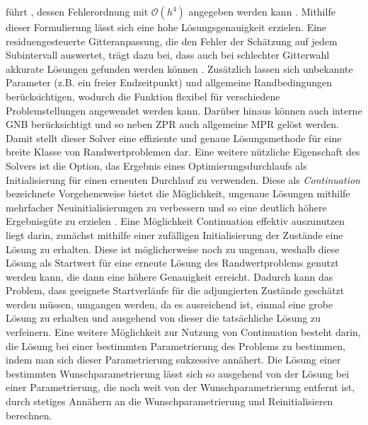 führt \cite{Cash.1980}, dessen Fehlerordnung mit $\mathcal{O}(h^4)$ angegeben werden kann \cite{Kierzenka.2001}. Mithilfe dieser Formulierung lässt sich eine hohe Lösungsgenauigkeit erzielen. Eine residuengesteuerte Gitteranpassung, die den Fehler der Schätzung auf jedem Subintervall auswertet, trägt dazu bei, dass auch bei schlechter Gitterwahl akkurate Lösungen gefunden werden können \cite{Kierzenka.2001}. Zusätzlich lassen sich unbekannte Parameter (z.B. ein freier Endzeitpunkt) und allgemeine Randbedingungen berücksichtigen, wodurch die Funktion flexibel für verschiedene Problemstellungen angewendet werden kann. Darüber hinaus können auch interne \gls{GNB} berücksichtigt und so neben \gls{ZPR} auch allgemeine \gls{MPR} gelöst werden. Damit stellt dieser Solver eine effiziente und genaue Lösungsmethode für eine breite Klasse von Randwertproblemen dar. Eine weitere nützliche Eigenschaft des Solvers ist die Option, das Ergebnis eines Optimierungsdurchlaufs als Initialisierung für einen erneuten Durchlauf zu verwenden. Diese als \textit{Continuation} bezeichnete Vorgehensweise bietet die Möglichkeit, ungenaue Lösungen mithilfe mehrfacher Neuinitialisierungen zu verbessern und so eine deutlich höhere Ergebnisgüte zu erzielen \cite{Kierzenka.2001}. Eine Möglichkeit Continuation effektiv auszunutzen liegt darin, zunächst mithilfe einer zufälligen Initialisierung der Zustände eine Lösung zu erhalten. Diese ist möglicherweise noch zu ungenau, weshalb diese Lösung als Startwert für eine erneute Lösung des Randwertproblems genutzt werden kann, die dann eine höhere Genauigkeit erreicht. Dadurch kann das Problem, dass geeignete Startverläufe für die adjungierten Zustände geschätzt werden müssen, umgangen werden, da es ausreichend ist, einmal eine grobe Lösung zu erhalten und ausgehend von dieser die tatsächliche Lösung zu verfeinern. Eine weitere Möglichkeit zur Nutzung von Continuation besteht darin, die Lösung bei einer bestimmten Parametrierung des Problems zu bestimmen, indem man sich dieser Parametrierung sukzessive annähert. Die Lösung einer bestimmten Wunschparametrierung lässt sich so ausgehend von der Lösung bei einer Parametrierung, die noch weit von der Wunschparametrierung entfernt ist, durch stetiges Annähern an die Wunschparametrierung und Reinitialisieren berechnen.

